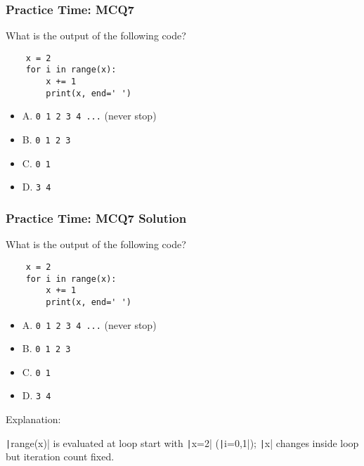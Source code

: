 \documentclass{beamer}
\begin{document}
\begin{frame}[fragile]
    \frametitle{Practice Time: MCQ7}
    What is the output of the following code?
    \begin{verbatim}
    x = 2
    for i in range(x):
        x += 1
        print(x, end=' ')
    \end{verbatim}
    \begin{itemize}
        \item A. \texttt{0 1 2 3 4 ...} (never stop)
        \item B. \texttt{0 1 2 3}
        \item C. \texttt{0 1}
        \item D. \texttt{3 4}
    \end{itemize}
\end{frame}
\begin{frame}[fragile]
    \frametitle{Practice Time: MCQ7 Solution}
    What is the output of the following code?
    \begin{verbatim}
    x = 2
    for i in range(x):
        x += 1
        print(x, end=' ')
    \end{verbatim}
    \begin{itemize}
        \item A. \texttt{0 1 2 3 4 ...} (never stop)
        \item B. \texttt{0 1 2 3}
        \item C. \texttt{0 1}
        \item \alert{D. \texttt{3 4}}
    \end{itemize}

    Explanation:

    \texttt|range(x)| is evaluated at loop start
    with \texttt|x=2| (\texttt|i=0,1|);
    \texttt|x| changes inside loop but iteration count fixed.
\end{frame}
\end{document}

